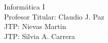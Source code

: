 \thispagestyle{empty}

\Large{Informática I}\\

\noindent Profesor Titular: Claudio J. Paz\\

\medskip
\noindent JTP: Nievas Martin\\
JTP: Silvia A. Carrera

